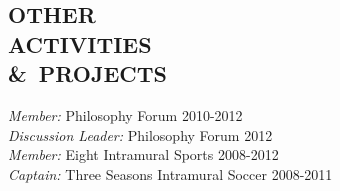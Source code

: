 \documentclass[line,margin]{res}
\begin{document}
\begin{resume}
\section{OTHER\\ACTIVITIES\\\&\ PROJECTS} {\sl Member:} Philosophy Forum \hfill 2010-2012\\
{\sl Discussion Leader:} Philosophy Forum \hfill 2012\\
{\sl Member:} Eight Intramural Sports \hfill 2008-2012\\
{\sl Captain:} Three Seasons Intramural Soccer \hfill 2008-2011\\
\end{resume}
\end{document}
